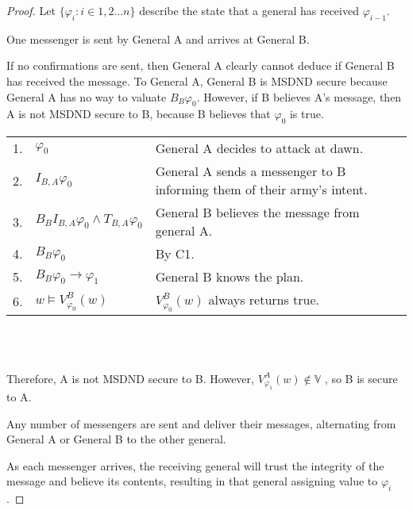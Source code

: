 \begin{proof}
Let $\{ \varphi_i : i \in 1,2 ... n \}$ describe the state that a general has received $\varphi_{i-1}$.

\begin{case}
One messenger is sent by General A and arrives at General B.
\label{case:generalsn0}
\end{case}

If no confirmations are sent, then General A clearly cannot deduce if General B has received the message.
To General A, General B is MSDND secure because General A has no way to valuate $B_B \varphi_0$.
However, if B believes A's message, then A is not MSDND secure to B, because B believes that $\varphi_0$ is true.

\begin{table}[H]
\centering
\small
\begin{tabularx}{\linewidth}{l l X}
1. & $\varphi_0$ & General A decides to attack at dawn. \\
2. & $I_{B,A} \varphi_0$ & General A sends a messenger to B informing them of their army's intent. \\
3. & $B_{B}I_{B,A} \varphi_0 \wedge T_{B,A} \varphi_0$ & General B believes the message from general A. \\
4. & $B_{B} \varphi_0$ & By C1. \\
5. & $B_{B} \varphi_0 \rightarrow \varphi_1$ & General B knows the plan. \\
6. & $w \vDash V_{\varphi_0}^{B}(w)$ & $V_{\varphi_0}^{B}(w)$ always returns true. \\
\end{tabularx} \\~\\
\label{tab:twoarmiesproof}
\end{table}

Therefore, A is not MSDND secure to B. However, $V_{\varphi_1}^{A}(w) \not \in \mathbb{V}$ , so B is secure to A.

\begin{case}
Any number of messengers are sent and deliver their messages, alternating from General A or General B to the other general. \label{case:generalsnn}
\end{case}

As each messenger arrives, the receiving general will trust the integrity of the message and believe its contents, resulting in that general assigning value to $\varphi_i$.


\end{proof}
